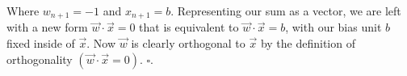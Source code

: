 \documentclass{article}
\begin{document}
Where $w_{n+1} = -1$ and $x_{n+1} = b$. Representing our sum as a vector, we are left with a new form $\vec{w} \cdot \vec{x} = 0$ 
that is equivalent to $\vec{w} \cdot \vec{x} = b$, with our bias unit $b$  fixed inside of $\vec{x}$. Now $\vec{w}$ is clearly 
orthogonal to $\vec{x}$ by the definition of orthogonality $(\vec{w} \cdot \vec{x} = 0)$. $\square$.
\end{document}

